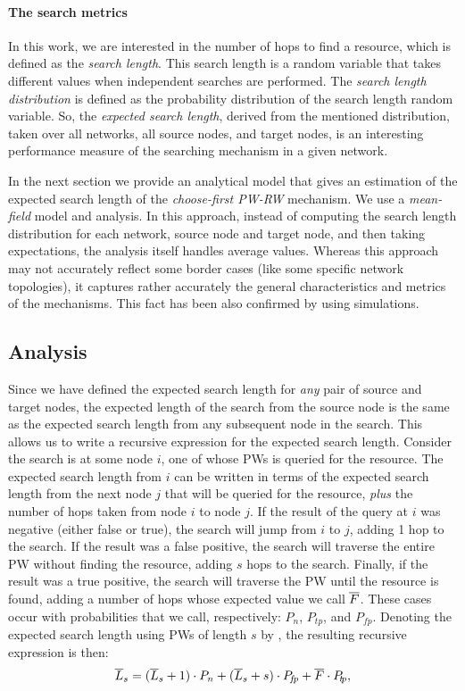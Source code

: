 \documentclass[]{elsarticle}
\newcommand{\pn} 	{\ensuremath{P_n}}
\newcommand{\ps} 	{\ensuremath{P_{\!t\!p}}}
\newcommand{\pf} 	{\ensuremath{P_{\!f\!p}}}
\begin{document}
\paragraph{The search metrics}

In this work, we are interested in the number of hops to find a resource, which is defined as the \emph{search length}. This search length is a random variable that takes different values when independent searches are performed. The \emph{search length distribution} is defined as the probability distribution of the search length random variable. So, the \emph{expected search length}, derived from the mentioned distribution, taken over all networks, all source nodes, and target nodes, is an interesting performance measure of the searching mechanism in a given network. 

In the next section we provide an analytical model that gives an estimation of the expected search length of the \emph{choose-first PW-RW} mechanism. We use a \emph{mean-field} model and analysis. In this approach, instead of computing the search length distribution for each network, source node and target node, and then taking expectations, the analysis itself handles average values. Whereas this approach may not accurately reflect some border cases (like some specific network topologies), it captures rather accurately the general characteristics and metrics of the mechanisms. This fact has been also confirmed by using simulations.

\subsection{Analysis}
\label{subsec:analysis}

Since we have defined the expected search length for \emph{any} pair of source and target nodes, 
the expected length of the search from the source node is the same as the expected search length from any subsequent node in the search. This allows us to write a recursive expression for the expected search length. Consider the search is at some node $i$, one of whose PWs is queried for the resource. The expected search length from $i$ can be written in terms of the expected search length from the next node $j$ that will be queried for the resource, \emph{plus} the number of hops taken from node $i$ to node $j$. If the result of the query at $i$ was negative (either false or true), the search will jump from $i$ to $j$, adding 1 hop to the search. If the result was a false positive, the search will traverse the entire PW without finding the resource, adding $s$ hops to the search. Finally, if the result was a true positive, the search will traverse the PW until the resource is found, adding a number of hops whose expected value we call $\overline{F}$. These cases occur with probabilities that we call, respectively: \pn, \ps, and \pf.
Denoting the expected search length using PWs of length $s$ by \Lsexp, the resulting recursive expression is then:
\begin{equation}
 \Lsexp = (\Lsexp + 1)\cdot \pn + (\Lsexp + s)\cdot \pf + \Texp\cdot \ps,
 \label{eq:Lsexp_SAW_recur}
\end{equation}
\end{document}
